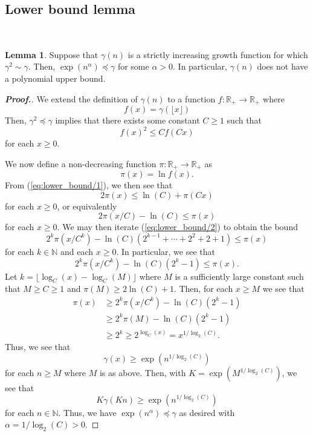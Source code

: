 \documentclass[11pt,a4paper,reqno]{amsart}
\theoremstyle{plain}
\theoremstyle{definition}
\newtheorem{lemma}[theorem]{Lemma}
\theoremstyle{definition}
\renewcommand\leq\leqslant
\renewcommand\geq\geqslant
\begin{document}
\subsection{Lower bound lemma}~

\begin{lemma}\label{lem:lower_bound}
	Suppose that $\gamma(n)$ is a strictly increasing growth function for which $\gamma^2 \sim \gamma$.
	Then, $ \exp(n^{\alpha})\preccurlyeq \gamma$ for some $\alpha>0$.
	In particular, $\gamma(n)$ does not have a polynomial upper bound.
\end{lemma}

\begin{proof}[\normalfont\bfseries Proof.]
We extend the definition of $\gamma(n)$ to a function $f\colon \mathbb{R}_+\to\mathbb{R}_+$ where
\[
  f(x) = \gamma(\lfloor x \rfloor)
\]
Then, $\gamma^2 \preccurlyeq \gamma$ implies that there exists some constant $C\geq 1$ such that
\begin{equation}\label{eq:lower_bound/1}
  f(x)^2
  \leq
  Cf(Cx)
\end{equation}
for each $x\geq 0$.

We now define a non-decreasing function $\pi\colon \mathbb R_+ \to \mathbb R_+$ as
\[
  \pi(x)=\ln f(x).
\]
From (\ref{eq:lower_bound/1}), we then see that
\[
  2\pi(x) \leq \ln(C)+\pi(Cx)
\]
for each $x \geq 0$, or equivalently
\begin{equation}\label{eq:lower_bound/2}
  2\pi(x/C) - \ln(C) \leq \pi(x)
\end{equation}
for each $x\geq 0$.
We may then iterate (\ref{eq:lower_bound/2}) to obtain the bound
\[
  2^k \pi(x/C^k) - \ln(C)(2^{k-1} + \cdots +2^2 + 2 + 1) \leq \pi(x)
\]
for each $k\in \mathbb N$ and each $x\geq 0$.
In particular, we see that
\[
  2^k \pi(x/C^k) - \ln(C)(2^k-1) \leq \pi(x).
\]
Let $k = \lfloor \log_C(x) - \log_C(M) \rfloor$ where $M$ is a sufficiently large constant such that $M\geq C\geq 1$ and $\pi(M)\geq 2\ln(C)+1$.
Then, for each $x\geq M$ we see that
\begin{align*}
  \pi(x)
  &\geq
  2^k \pi(x/C^k) - \ln(C)(2^k-1)
  \\
  &\geq
  2^k \pi(M) - \ln(C)(2^k-1) 
  \\
  &\geq
  2^k \geq 2^{\log_C(x)} = x^{1/\log_2(C)}.
\end{align*}
Thus, we see that
\[
  \gamma(x) \geq \exp(n^{1/\log_2(C)})
\]
for each $n \geq M$ where $M$ is as above.
Then, with $K = \exp(M^{1/\log_2(C)})$, we see that
\[
  K \gamma(K n) \geq \exp(n^{1/\log_2(C)})
\]
for each $n\in \mathbb N$.
Thus, we have $\exp(n^\alpha) \preccurlyeq \gamma$ as desired with $\alpha = 1/\log_2(C) > 0$.
\end{proof}
\end{document}
